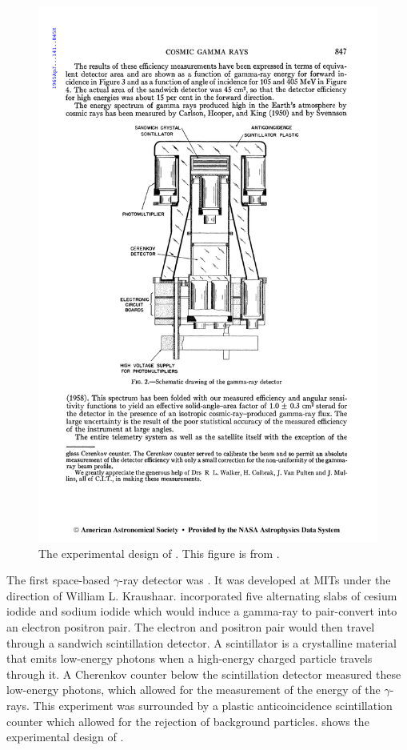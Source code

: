 \begin{figure}[htbp]
\centering
\includegraphics{chapters/introduction/figures/explorer_xi_instrument.pdf}
\caption{
The experimental design of \explorerxi.
This figure is from \cite{kraushaar_1965_explorer-experiment}. }
\end{figure}

The first space-based $\gamma$-ray detector was \explorerxi
\cite{kraushaar_1965_explorer-experiment}.  It was developed at \acp{MIT}
under the direction of William L. Kraushaar.  \explorerxi incorporated
five alternating slabs of cesium iodide and sodium iodide which would
induce a gamma-ray to pair-convert into an electron positron pair. The
electron and positron pair would then travel through a sandwich
scintillation detector.  A scintillator is a crystalline material that
emits low-energy photons when a high-energy charged particle travels
through it.  A Cherenkov counter below the scintillation detector
measured these low-energy photons, which allowed for the measurement
of the energy of the $\gamma$-rays.  This experiment was surrounded
by a plastic anticoincidence scintillation counter which allowed for
the rejection of background particles. 
shows the experimental design of \explorerxi.


